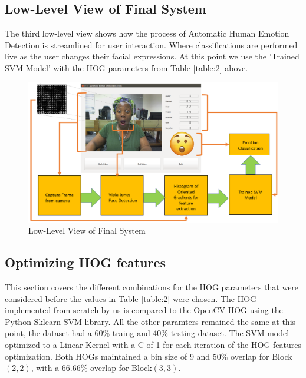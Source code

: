 \subsection{Low-Level View of Final System}
The third low-level view shows how the process of Automatic Human Emotion Detection is streamlined for user interaction. Where classifications are performed live as the user changes their facial expressions. At this point we use the 'Trained SVM Model' with the HOG parameters from Table \ref{table:2} above.
\begin{figure}[H]
  \centering
  \includegraphics[scale=0.6]{demo}
  \caption{Low-Level View of Final System}
  \label{fig: lowlevel3}
\end{figure} 

\subsection{Optimizing HOG features}
This section covers the different combinations for the HOG parameters that were considered before the values in Table \ref{table:2} were chosen. The HOG implemented from scratch by us is compared to the OpenCV HOG using the Python Sklearn SVM library. All the other paramters remained the same at this point, the dataset had a 60\% traing and 40\% testing dataset. The SVM model optimized to a Linear Kernel with a C of 1 for each iteration of the HOG features optimization. Both HOGs maintained a bin size of 9 and 50\% overlap for Block$(2,2)$, with a 66.66\% overlap for Block$(3,3)$.
\begin{table}[H]
\centering
{}
\caption{HOG Optimization}
\label{table:class}
\end{table}
